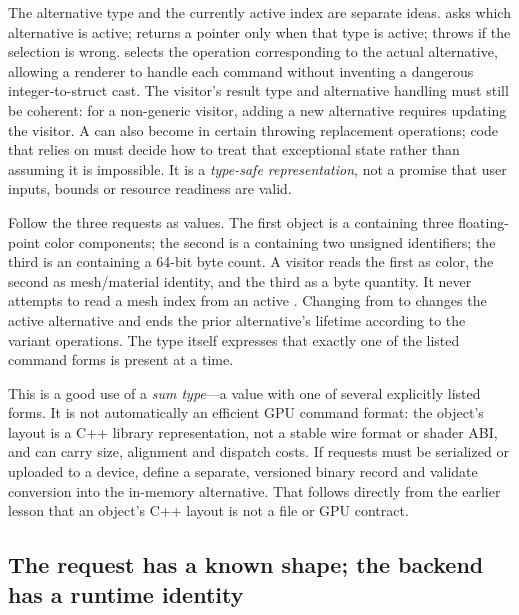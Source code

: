 The alternative type and the currently active index are separate ideas.  asks which alternative is active;  returns a pointer only when that type is active;  throws  if the selection is wrong.  selects the operation corresponding to the actual alternative, allowing a renderer to handle each command without inventing a dangerous integer-to-struct cast. The visitor's result type and alternative handling must still be coherent: for a non-generic visitor, adding a new alternative requires updating the visitor. A  can also become  in certain throwing replacement operations; code that relies on  must decide how to treat that exceptional state rather than assuming it is impossible. It is a \emph{type-safe representation}, not a promise that user inputs, bounds or resource readiness are valid.

Follow the three requests as values. The first object is a  containing three floating-point color components; the second is a  containing two unsigned identifiers; the third is an  containing a 64-bit byte count. A visitor reads the first as color, the second as mesh/material identity, and the third as a byte quantity. It never attempts to read a mesh index from an active . Changing from  to  changes the active alternative and ends the prior alternative's lifetime according to the variant operations. The type itself expresses that exactly one of the listed command forms is present at a time.

This is a good use of a \emph{sum type}---a value with one of several explicitly listed forms. It is not automatically an efficient GPU command format: the object's layout is a C++ library representation, not a stable wire format or shader ABI, and  can carry size, alignment and dispatch costs. If requests must be serialized or uploaded to a device, define a separate, versioned binary record and validate conversion into the in-memory alternative. That follows directly from the earlier lesson that an object's C++ layout is not a file or GPU contract.

\subsection{The request has a known shape; the backend has a runtime identity}\label{01-foundations-i-ch004-the-request-has-a-known-shape-the-backend-has-a-runtime-identity}

